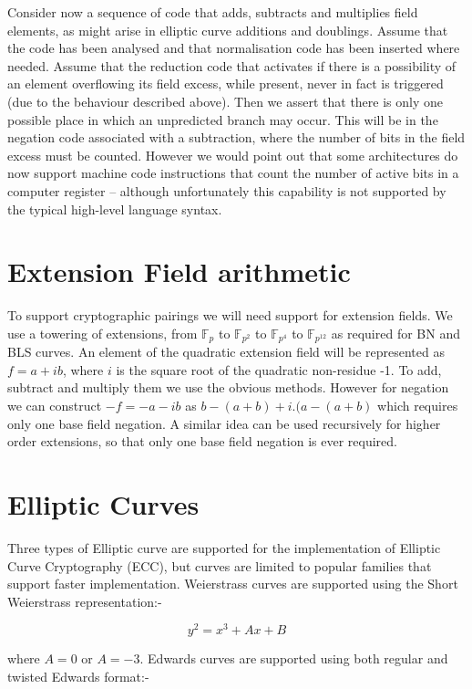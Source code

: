 \documentclass{llncs}
\newcommand{\F}{\mathbb{F}}
\begin{document}
Consider now a sequence of code that adds, subtracts and multiplies field elements, as might arise in elliptic curve additions and doublings. Assume that the code has been analysed and that normalisation 
code has been inserted where needed. Assume that the reduction code that 
activates if there is a possibility of an element overflowing its field excess, while present, never in fact is triggered (due to the behaviour described above). Then we assert that there is only one 
possible place in which an unpredicted branch may occur. This will be in the negation code associated with a subtraction, where the number of bits in the field excess must be counted. However we would 
point out that some architectures do now support machine code instructions that count the number of active bits in a computer register -- although unfortunately this capability is not supported by the 
typical high-level language syntax.

\section{Extension Field arithmetic}

To support cryptographic pairings we will need support for extension fields. We use a towering of extensions, from $\F_p$ to $\F_{p^2}$ to $\F_{p^4}$ to $\F_{p^{12}}$ as required for 
BN \cite{barreto-naehrig} and BLS \cite{barreto-lynn-scott} curves. An element 
of the quadratic extension field will be represented as $f=a+ib$, where $i$ is the square root of the quadratic non-residue -1.
To add, subtract and multiply them we use the obvious methods. However for negation we can construct $-f=-a-ib$ as $b-(a+b)+i.(a-(a+b)$ which requires only one base field negation. A similar idea 
can be used recursively for higher order extensions, so that only one base field negation is ever required.


\section{Elliptic Curves}

Three types of Elliptic curve are supported for the implementation of Elliptic Curve Cryptography (ECC), but curves are limited to popular families that support faster implementation. Weierstrass 
curves are supported using the Short Weierstrass representation:-

$$ y^2=x^3+Ax+B $$

where $A=0$ or $A=-3$. Edwards curves are supported using both regular and twisted Edwards format:-
\end{document}
